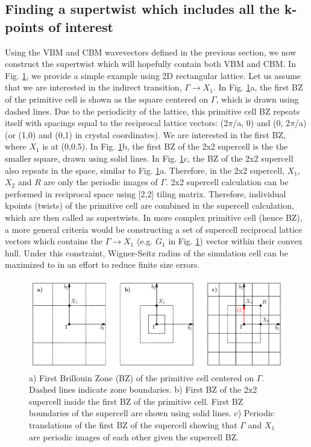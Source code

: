 \subsection{Finding a supertwist which includes all the k-points of interest}
Using the VBM and CBM wavevectors defined in the previous section, we now construct the supertwist which will hopefully contain both VBM and CBM. In Fig. \ref{fig:lab5_twists}, we provide a simple example using 2D rectangular lattice. 
Let us assume that we are interested in the indirect transition, $\Gamma \rightarrow X_1$. 
In Fig. \ref{fig:lab5_twists}a, the first BZ of the primitive cell is shown as the square centered on $\Gamma$, which is drawn using dashed lines. Due to the periodicity of the lattice, this primitive cell BZ repeats itself with spacings equal to the reciprocal lattice vectors: (2$\pi$/a, 0) and (0, 2$\pi$/a) (or (1,0) and (0,1) in crystal coordinates). 
We are interested in the  first BZ, where $X_1$ is at (0,0.5). 
In Fig. \ref{fig:lab5_twists}b, the first BZ of the 2x2 supercell is the the smaller square, drawn using solid lines. 
In Fig. \ref{fig:lab5_twists}c, the BZ of the 2x2 supercell also repeats in the space, similar to Fig. \ref{fig:lab5_twists}a. 
Therefore, in the 2x2 supercell, $X_1$, $X_2$ and $R$ are only the periodic images of $\Gamma$.  2x2 supercell calculation can be performed in reciprocal space using [2,2] tiling matrix. 
Therefore, individual kpoints (twists) of the primitive cell are combined in the supercell calculation, which are then called as supertwists. 
In more complex primitive cell (hence BZ), a more general criteria would be constructing a set of supercell reciprocal lattice vectors which contains the $\Gamma \rightarrow X_1$ (e.g. $G_1$ in Fig. \ref{fig:lab5_twists}) vector within their convex hull. 
Under this constraint, Wigner-Seitz radius of the simulation cell can be maximized to in an effort to reduce finite size errors. 

\begin{figure}
	\includegraphics[width=\textwidth]{figures/lab_excited_twists}
	\caption{a) First Brillouin Zone (BZ) of the primitive cell centered on $\Gamma$. Dashed lines indicate zone boundaries. b) First BZ of the 2x2 supercell inside the first BZ of the primitive cell. First BZ boundaries of the supercell are shown using solid lines. c) Periodic translations of the first BZ of the supercell showing that $\Gamma$ and $X_1$ are periodic images of each other given the supercell BZ. }
	\label{fig:lab5_twists}
\end{figure}

